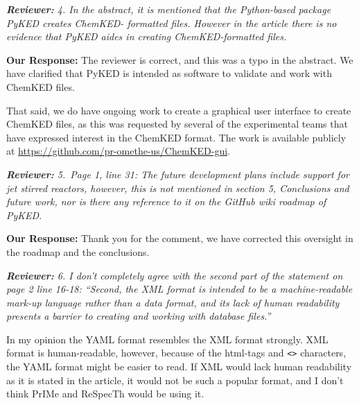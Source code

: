 \documentclass[a4paper,10pt]{elsarticle}
\newenvironment{reviewer}{\vspace{0.5\baselineskip}\begingroup\itshape\textbf{Reviewer:}}{\endgroup\vspace{0.5\baselineskip}}
\newenvironment{response}{\vspace{0.5\baselineskip}\textbf{Our Response:}}{\vspace{0.5\baselineskip}}
\begin{document}
\begin{reviewer}
    4. In the abstract, it is mentioned that the Python-based package PyKED creates ChemKED-
    formatted files. However in the article there is no evidence that PyKED aides in creating
    ChemKED-formatted files.
\end{reviewer}

\begin{response}
    The reviewer is correct, and this was a typo in the abstract. We have clarified that PyKED is
    intended as software to validate and work with ChemKED files.

    That said, we do have ongoing work to create a graphical user interface to create ChemKED files,
    as this was requested by several of the experimental teams that have expressed interest in the
    ChemKED format. The work is available publicly at
    \url{https://github.com/pr-omethe-us/ChemKED-gui}.
\end{response}

\begin{reviewer}
    5.~Page 1, line 31: The future development plans include support for jet stirred reactors,
    however, this is not mentioned in section 5, Conclusions and future work, nor is there any
    reference to it on the GitHub wiki roadmap of PyKED.
\end{reviewer}

\begin{response}
    Thank you for the comment, we have corrected this oversight in the roadmap and the conclusions.
\end{response}

\begin{reviewer}
    6. I don't completely agree with the second part of the statement on page 2 line 16-18:
    ``Second, the XML format is intended to be a machine-readable mark-up language rather than a
    data format, and its lack of human readability presents a barrier to creating and working with
    database files.''

    In my opinion the YAML format resembles the XML format strongly. XML format is human-readable,
    however, because of the html-tags and \texttt{<>} characters, the YAML format might be easier to
    read. If XML would lack human readability as it is stated in the article, it would not be such a
    popular format, and I don't think PrIMe and ReSpecTh would be using it.
\end{reviewer}
\end{document}
